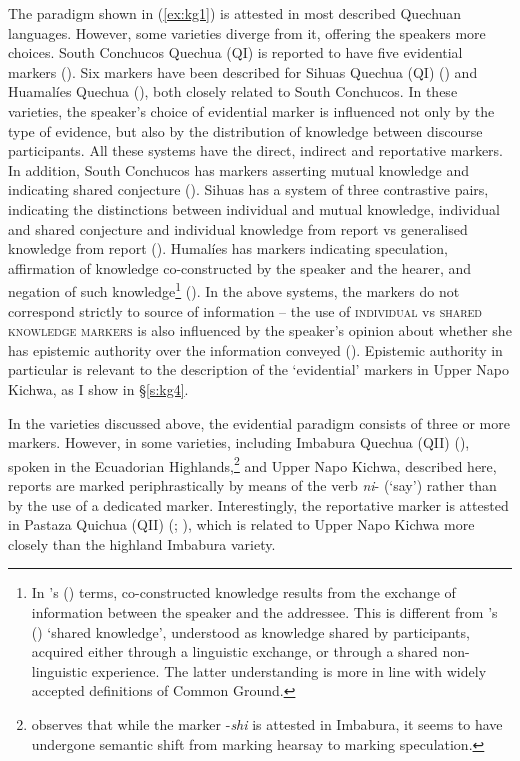 \documentclass[output=paper]{langscibook}
\begin{document}
The paradigm shown in (\ref{ex:kg1}) is attested in most described Quechuan languages. However, some varieties diverge from it, offering the speakers more choices. South Conchucos Quechua (QI) is reported to have five evidential markers (\citealt{DanielHintz2012, Hintz2017}). Six markers have been described for Sihuas Quechua (QI) (\citealt{DianneHintz2012,Hintz2017}) and Huamalíes Quechua (\citealt{Howard2012}), both closely related to South Conchucos. In these varieties, the speaker’s choice of evidential marker is influenced not only by the type of evidence, but also by the distribution of knowledge between discourse participants.  All these systems have the direct, indirect and reportative markers. In addition, South Conchucos has markers asserting mutual knowledge and indicating shared conjecture (\citealt{Hintz2017}). Sihuas has a system of three contrastive pairs, indicating the distinctions between individual and mutual knowledge, individual and shared conjecture and individual knowledge from report vs generalised knowledge from report (\citealt{Hintz2017}). Humalíes has markers indicating speculation, affirmation of knowledge co-constructed by the speaker and the hearer, and negation of such knowledge\footnote{In \citeauthor{Howard2012}'s (\citeyear{Howard2012}) terms, co-constructed knowledge results from the exchange of information between the speaker and the addressee. This is different from \citeauthor{Hintz2017}'s (\citeyear{Hintz2017}) ‘shared knowledge’, understood as knowledge shared by participants, acquired either through a linguistic exchange, or through a shared non-linguistic experience. The latter understanding is more in line with widely accepted definitions of Common Ground.} (\citealt{Howard2012}). In the above systems, the markers do not correspond strictly to source of information – the use of \textsc{individual} vs \textsc{shared knowledge markers} is also influenced by the speaker’s opinion about whether she has epistemic authority over the information conveyed (\citealt[96]{Hintz2017}). Epistemic authority in particular is relevant to the description of the ‘evidential’ markers in Upper Napo Kichwa, as I show in §‎\ref{s:kg4}.

In the varieties discussed above, the evidential paradigm consists of three or more markers. However, in some varieties, including Imbabura Quechua (QII) (\citealt[164--165]{Cole1982}), spoken in the Ecuadorian Highlands,\footnote{\cite[165]{Cole1982} observes that while the marker -\textit{shi} is attested in Imbabura, it seems to have undergone semantic shift from marking hearsay to marking speculation.} and Upper Napo Kichwa, described here, reports are marked periphrastically by means of the verb \textit{ni}- (‘say’) rather than by the use of a dedicated marker. Interestingly, the reportative marker is attested in Pastaza Quichua (QII) (\citealt{Nuckolls1993}; \citealt{Nuckolls2012}), which is related to Upper Napo Kichwa more closely than the highland Imbabura variety.
\end{document}
